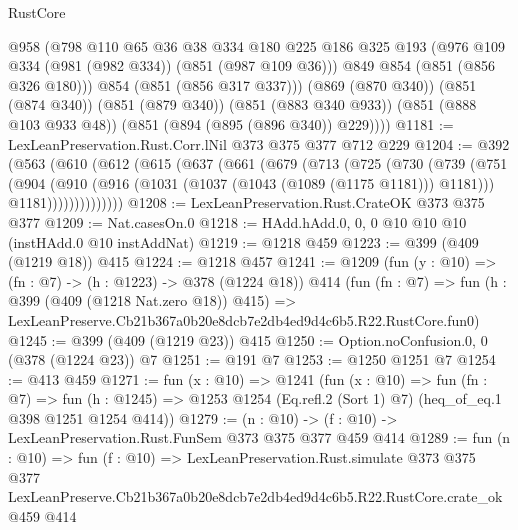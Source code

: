 \begin{lexlean}{RustCore}
\begin{coremodule}
          @958
          (@798
            @110
            @65
            @36
            @38
            @334
            @180
            @225
            @186
            @325
            @193
            (@976 @109 @334 (@981 (@982 @334)) (@851 (@987 @109 @36)))
            @849
            @854
            (@851 (@856 @326 @180)))
          @854
          (@851 (@856 @317 @337)))
        (@869 (@870 @340))
        (@851 (@874 @340))
        (@851 (@879 @340))
        (@851 (@883 @340 @933))
        (@851 (@888 @103 @933 @48))
        (@851 (@894 (@895 (@896 @340)) @229))))
@1181 := LexLeanPreservation.Rust.Corr.lNil @373 @375 @377 @712 @229
@1204 := @392
    (@563
      (@610
        (@612
          (@615
            (@637
              (@661
                (@679
                  (@713
                    (@725
                      (@730
                        (@739
                          (@751
                            (@904
                              (@910
                                (@916 (@1031 (@1037 (@1043 (@1089 (@1175 @1181))) @1181)))
                                @1181))))))))))))))
@1208 := LexLeanPreservation.Rust.CrateOK @373 @375 @377
@1209 := Nat.casesOn.{0}
@1218 := HAdd.hAdd.{0, 0, 0} @10 @10 @10 (instHAdd.{0} @10 instAddNat)
@1219 := @1218 @459
@1223 := @399 (@409 (@1219 @18)) @415
@1224 := @1218 @457
@1241 := @1209
    (fun (y : @10) => (fn : @7) -> (h : @1223) -> @378 (@1224 @18))
    @414
    (fun (fn : @7) =>
    fun (h : @399 (@409 (@1218 Nat.zero @18)) @415) =>
    LexLeanPreserve.Cb21b367a0b20e8dcb7e2db4ed9d4c6b5.R22.RustCore.fun0)
@1245 := @399 (@409 (@1219 @23)) @415
@1250 := Option.noConfusion.{0, 0} (@378 (@1224 @23)) @7
@1251 := @191 @7
@1253 := @1250 @1251 @7
@1254 := @413 @459
@1271 := fun (x : @10) =>
  @1241
    (fun (x : @10) =>
    fun (fn : @7) =>
    fun (h : @1245) => @1253 @1254 (Eq.refl.{2} (Sort 1) @7) (heq_of_eq.{1} @398 @1251 @1254 @414))
@1279 := (n : @10) -> (f : @10) -> LexLeanPreservation.Rust.FunSem @373 @375 @377 @459 @414
@1289 := fun (n : @10) =>
  fun (f : @10) =>
  LexLeanPreservation.Rust.simulate
    @373
    @375
    @377
    LexLeanPreserve.Cb21b367a0b20e8dcb7e2db4ed9d4c6b5.R22.RustCore.crate_ok
    @459
    @414
\end{coremodule}
\end{lexlean}
